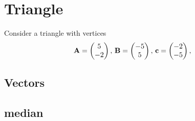 \documentclass[11pt]{book}
\begin{document}
\frontmatter
\tableofcontents
\setcounter{page}{1}
\mainmatter
\chapter{Triangle}
Consider a triangle with vertices
\begin{align}
\label{eq:tri-pts}
\vec{A}=\myvec{5 \\ -2},\,
\vec{B}=\myvec{-5\\5},\,
	\vec{c}=\myvec{-2\\-5},\,
\end{align}

\section{Vectors}
\section{median}
\end{document}
